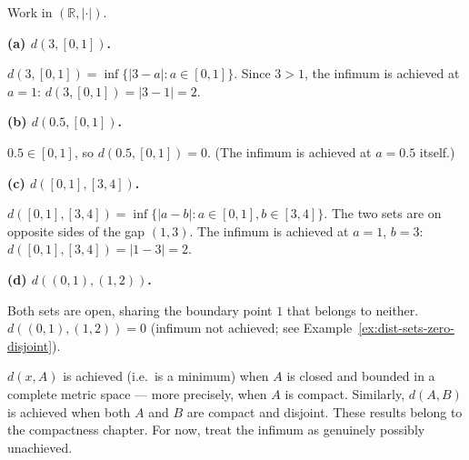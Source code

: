 \begin{example}
\label{ex:dist-point-set-concrete}
Work in $(\mathbb{R}, |\cdot|)$.

\medskip
\noindent\textbf{(a) $d(3, [0,1])$.}

$d(3, [0,1]) = \inf\{|3 - a| : a \in [0,1]\}$.
Since $3 > 1$, the infimum is achieved at $a = 1$:
$d(3, [0,1]) = |3 - 1| = 2$.

\medskip
\noindent\textbf{(b) $d(0.5, [0,1])$.}

$0.5 \in [0,1]$, so $d(0.5, [0,1]) = 0$.
(The infimum is achieved at $a = 0.5$ itself.)

\medskip
\noindent\textbf{(c) $d([0,1], [3,4])$.}

$d([0,1],[3,4]) = \inf\{|a - b| : a \in [0,1], b \in [3,4]\}$.
The two sets are on opposite sides of the gap $(1,3)$.
The infimum is achieved at $a = 1$, $b = 3$:
$d([0,1],[3,4]) = |1 - 3| = 2$.

\medskip
\noindent\textbf{(d) $d((0,1), (1,2))$.}

Both sets are open, sharing the boundary point $1$ that belongs to neither.
$d((0,1),(1,2)) = 0$ (infimum not achieved; see Example~\ref{ex:dist-sets-zero-disjoint}).
\end{example}

\begin{remark*}
$d(x, A)$ is achieved (i.e.\ is a minimum) when $A$ is closed and bounded
in a complete metric space --- more precisely, when $A$ is compact.
Similarly, $d(A, B)$ is achieved when both $A$ and $B$ are compact and disjoint.
These results belong to the compactness chapter.
For now, treat the infimum as genuinely possibly unachieved.
\end{remark*}
